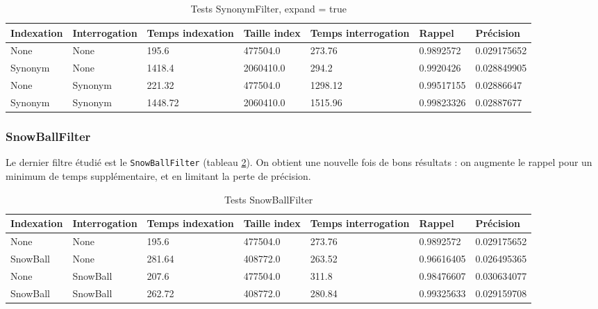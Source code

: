 \begin{table}[!htbp]
    \hspace{-2cm}
                \begin{tabular}{|p{2.5cm}|p{2.5cm}|p{2cm}|p{2cm}|p{2.5cm}|p{2cm}|p{2cm}|}
                    \hline
                    \textbf{Indexation} & \textbf{Interrogation} & \textbf{Temps \mbox{indexation}} & \textbf{Taille \mbox{index}} & \textbf{Temps \mbox{interrogation}} & \textbf{Rappel} & \textbf{Précision}\\
                    \hline
                    None & None & 195.6 & 477504.0 & 273.76 & 0.9892572 & 0.029175652\\
                    \hline
Synonym & None & 1418.4 & 2060410.0 & 294.2 & 0.9920426 & 0.028849905\\
        \hline
None & Synonym & 221.32 & 477504.0 & 1298.12 & 0.99517155 & 0.02886647\\
        \hline
Synonym & Synonym & 1448.72 & 2060410.0 & 1515.96 & 0.99823326 & 0.02887677\\
                    \hline
                \end{tabular}
                \caption{Tests SynonymFilter, expand = true}
                \label{tab:tests_SynonymFilterexpandtrue}
            \end{table}

\subsubsection{SnowBallFilter}

Le dernier filtre étudié est le \texttt{SnowBallFilter} (tableau \ref{tab:tests_SnowBallFilter}). On obtient une nouvelle fois de bons résultats : on augmente le rappel pour un minimum de temps supplémentaire, et en limitant la perte de précision.

\begin{table}[!htbp]
    \hspace{-2cm}
                \begin{tabular}{|p{2.5cm}|p{2.5cm}|p{2cm}|p{2cm}|p{2.5cm}|p{2cm}|p{2cm}|}
                    \hline
                    \textbf{Indexation} & \textbf{Interrogation} & \textbf{Temps \mbox{indexation}} & \textbf{Taille \mbox{index}} & \textbf{Temps \mbox{interrogation}} & \textbf{Rappel} & \textbf{Précision}\\
                    \hline
                    None & None & 195.6 & 477504.0 & 273.76 & 0.9892572 & 0.029175652\\
                    \hline
SnowBall & None & 281.64 & 408772.0 & 263.52 & 0.96616405 & 0.026495365\\
		            \hline
None & SnowBall & 207.6 & 477504.0 & 311.8 & 0.98476607 & 0.030634077\\
		            \hline
SnowBall & SnowBall & 262.72 & 408772.0 & 280.84 & 0.99325633 & 0.029159708\\
                    \hline
                \end{tabular}
                \caption{Tests SnowBallFilter}
                \label{tab:tests_SnowBallFilter}
            \end{table}

